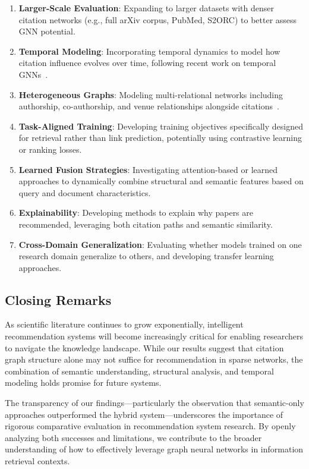 \documentclass[pdflatex,sn-mathphys-num]{sn-jnl}
\theoremstyle{thmstyleone}%
\theoremstyle{thmstyletwo}%
\theoremstyle{thmstylethree}%
\begin{document}
\begin{enumerate}
    \item \textbf{Larger-Scale Evaluation}: Expanding to larger datasets with denser citation networks (e.g., full arXiv corpus, PubMed, S2ORC) to better assess GNN potential.

    \item \textbf{Temporal Modeling}: Incorporating temporal dynamics to model how citation influence evolves over time, following recent work on temporal GNNs~\cite{shen2024temporal}.

    \item \textbf{Heterogeneous Graphs}: Modeling multi-relational networks including authorship, co-authorship, and venue relationships alongside citations~\cite{hgt}.

    \item \textbf{Task-Aligned Training}: Developing training objectives specifically designed for retrieval rather than link prediction, potentially using contrastive learning or ranking losses.

    \item \textbf{Learned Fusion Strategies}: Investigating attention-based or learned approaches to dynamically combine structural and semantic features based on query and document characteristics.

    \item \textbf{Explainability}: Developing methods to explain why papers are recommended, leveraging both citation paths and semantic similarity.

    \item \textbf{Cross-Domain Generalization}: Evaluating whether models trained on one research domain generalize to others, and developing transfer learning approaches.
\end{enumerate}

\subsection{Closing Remarks}

As scientific literature continues to grow exponentially, intelligent recommendation systems will become increasingly critical for enabling researchers to navigate the knowledge landscape. While our results suggest that citation graph structure alone may not suffice for recommendation in sparse networks, the combination of semantic understanding, structural analysis, and temporal modeling holds promise for future systems.

The transparency of our findings—particularly the observation that semantic-only approaches outperformed the hybrid system—underscores the importance of rigorous comparative evaluation in recommendation system research. By openly analyzing both successes and limitations, we contribute to the broader understanding of how to effectively leverage graph neural networks in information retrieval contexts.

\newpage


\end{document}
